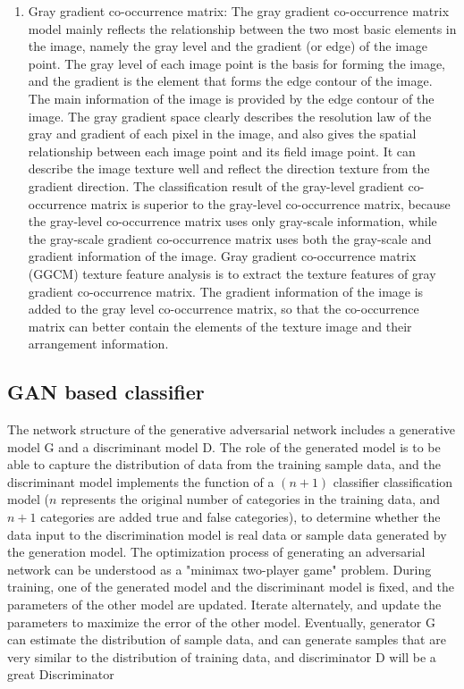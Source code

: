 \documentclass[11pt,en]{elegantpaper}
\begin{document}
\begin{enumerate}
	\item Gray gradient co-occurrence matrix: The gray gradient co-occurrence matrix model mainly reflects the relationship between the two most basic elements in the image, namely the gray level and the gradient (or edge) of the image point. The gray level of each image point is the basis for forming the image, and the gradient is the element that forms the edge contour of the image. The main information of the image is provided by the edge contour of the image. The gray gradient space clearly describes the resolution law of the gray and gradient of each pixel in the image, and also gives the spatial relationship between each image point and its field image point. It can describe the image texture well and reflect the direction texture from the gradient direction. The classification result of the gray-level gradient co-occurrence matrix is superior to the gray-level co-occurrence matrix, because the gray-level co-occurrence matrix uses only gray-scale information, while the gray-scale gradient co-occurrence matrix uses both the gray-scale and gradient information of the image. Gray gradient co-occurrence matrix (GGCM) texture feature analysis is to extract the texture features of gray gradient co-occurrence matrix. The gradient information of the image is added to the gray level co-occurrence matrix, so that the co-occurrence matrix can better contain the elements of the texture image and their arrangement information.
\end{enumerate}




\subsection{GAN based classifier}
The network structure of the generative adversarial network includes a generative model G and a discriminant model D. The role of the generated model is to be able to capture the distribution of data from the training sample data, and the discriminant model implements the function of a $(n + 1)$ classifier classification model ($n$ represents the original number of categories in the training data, and $n +1$ categories are added true and false categories), to determine whether the data input to the discrimination model is real data or sample data generated by the generation model. The optimization process of generating an adversarial network can be understood as a "minimax two-player game" problem. During training, one of the generated model and the discriminant model is fixed, and the parameters of the other model are updated. Iterate alternately, and update the parameters to maximize the error of the other model. Eventually, generator G can estimate the distribution of sample data, and can generate samples that are very similar to the distribution of training data, and discriminator D will be a great Discriminator
\end{document}
